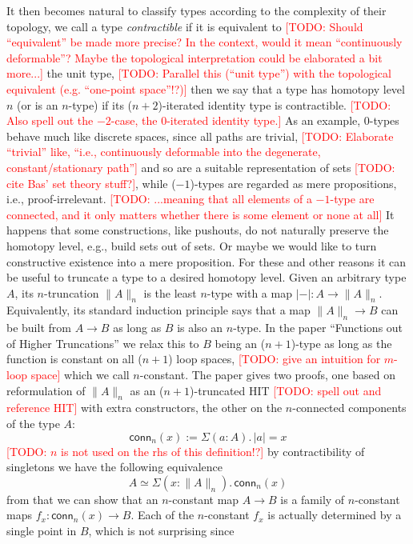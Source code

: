 \documentclass{book}
\newcommand{\TODO}[1]{\textcolor{red}{[TODO: #1]}}
\newcommand{\tr}[2]{\| #2 \|_{#1}}
\newcommand{\trcon}[1]{| #1 |}
\newcommand{\conn}{\mathsf{conn}}
\newcommand{\sd}{.\,}
\begin{document}
It then becomes natural to classify types according to the complexity
of their topology, we call a type \emph{contractible} if it is
equivalent to \TODO{Should ``equivalent'' be made more precise?  In
  the context, would it mean ``continuously deformable''?  Maybe the
  topological interpretation could be elaborated a bit more...}
the unit type, \TODO{Parallel this (``unit type'') with the
  topological equivalent (e.g. ``one-point space''!?)}
then we say that a type has homotopy level $n$ (or is an
$n$-type) if its ($n{+}2$)-iterated identity type is contractible.
\TODO{Also spell out the $-2$-case, the $0$-iterated identity type.}
As an example,
$0$-types behave much like discrete spaces, since all paths are
trivial, \TODO{Elaborate ``trivial'' like, ``i.e., continuously
  deformable into the degenerate, constant/stationary path''}
and so are a suitable representation of sets \TODO{cite Bas' set theory stuff?},
while ($-1$)-types are regarded as mere propositions, i.e.,
proof-irrelevant. \TODO{...meaning that all elements of a $-1$-type are
  connected, and it only matters whether there is some element or none
  at all}
It happens that some constructions, like pushouts, do not naturally
preserve the homotopy level, e.g., build sets out of sets.  Or maybe we
would like to turn constructive existence into a mere proposition.  For
these and other reasons it can be useful to truncate a type to a
desired homotopy level.
Given an arbitrary type $A$, its $n$-truncation $\tr{n}{A}$ is the least
$n$-type with a map $\trcon{{-}} : A \to \tr{n}{A}$.  Equivalently, its standard
induction principle says that a map $\tr{n}{A} \to B$ can be built
from $A \to B$ as long as $B$ is also an $n$-type.
In the paper ``Functions out of Higher Truncations'' we relax this to
$B$ being an ($n{+}1$)-type as long as the function is constant on all
($n{+}1$) loop spaces, \TODO{give an intuition for $m$-loop space}
which we call $n$-constant.
The paper gives two proofs, one based on reformulation of $\tr{n}{A}$
as an ($n{+}1$)-truncated HIT \TODO{spell out and reference HIT}
with extra constructors, the other on the
$n$-connected components of the type $A$:
\[
\conn_n(x) := \Sigma (a : A)\sd \trcon{a} = x
\]
\TODO{$n$ is not used on the rhs of this definition!?}
by contractibility of singletons we have the following equivalence
\[
A \simeq \Sigma (x : \tr{n}{A})\sd \conn_n(x)
\]
from that we can show that an $n$-constant map $A \to B$ is a family of $n$-constant
maps $f_x : \conn_n(x) \to B$. Each of the $n$-constant $f_x$ is actually
determined by a single point in $B$, which is not surprising since
\end{document}
